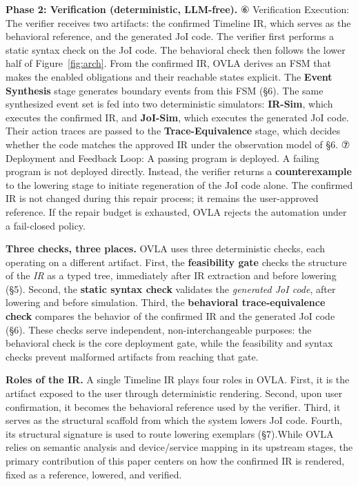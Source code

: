 \documentclass[sigconf,nonacm,anonymous,review]{acmart}
\begin{document}
\textbf{Phase 2: Verification (deterministic, LLM-free).} ⑥ Verification Execution: The verifier receives two artifacts: the confirmed Timeline IR, which serves as the behavioral reference, and the generated JoI code. %
The verifier first performs a static syntax check on the JoI code. The behavioral check then follows the lower half of Figure~\ref{fig:arch}. From the confirmed IR, OVLA derives an FSM that makes the enabled obligations and their reachable states explicit. The \textbf{Event Synthesis} stage generates boundary events from this FSM (\S6). The same synthesized event set is fed into two deterministic simulators: \textbf{IR-Sim}, which executes the confirmed IR, and \textbf{JoI-Sim}, which executes the generated JoI code. Their action traces are passed to the \textbf{Trace-Equivalence} stage, which decides whether the code matches the approved IR under the observation model of \S6. ⑦ Deployment and Feedback Loop: A passing program is deployed. A failing program is not deployed directly. Instead, the verifier returns a \textbf{counterexample} to the lowering stage to initiate regeneration of the JoI code alone.%
The confirmed IR is not changed during this repair process; it remains the user-approved reference. If the repair budget is exhausted, OVLA rejects the automation under a fail-closed policy.

\textbf{Three checks, three places.} OVLA uses three deterministic checks, each operating on a different artifact. First, the \textbf{feasibility gate} checks the structure of the \emph{IR} as a typed tree, immediately after IR extraction and before lowering (\S5). Second, the \textbf{static syntax check} validates the \emph{generated JoI code}, after lowering and before simulation. Third, the \textbf{behavioral trace-equivalence check} compares the behavior of the confirmed IR and the generated JoI code (\S6). These checks serve independent, non-interchangeable purposes: %
the behavioral check is the core deployment gate, while the feasibility and syntax checks prevent malformed artifacts from reaching that gate.

\textbf{Roles of the IR.} A single Timeline IR plays four roles in OVLA. First, it is the artifact exposed to the user through deterministic rendering. Second, upon user confirmation, it becomes the behavioral reference used by the verifier. Third, it serves as the structural scaffold from which the system lowers JoI code. Fourth, its structural signature is used to route lowering exemplars (\S7).While OVLA relies on semantic analysis and device/service mapping in its upstream stages, the primary contribution of this paper centers on how the confirmed IR is rendered, fixed as a reference, lowered, and verified.
\end{document}
